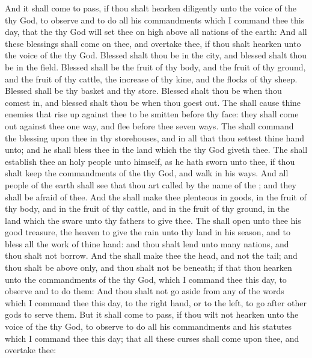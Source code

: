 \begin{biblechapter} %
 And it shall come to pass, if thou shalt hearken diligently unto the voice of the \LORD thy God, to observe and to do all his commandments which I command thee this day, that the \LORD thy God will set thee on high above all nations of the earth:
\verse And all these blessings shall come on thee, and overtake thee, if thou shalt hearken unto the voice of the \LORD thy God.
\verse Blessed shalt thou be in the city, and blessed shalt thou be in the field.
\verse Blessed shall be the fruit of thy body, and the fruit of thy ground, and the fruit of thy cattle, the increase of thy kine, and the flocks of thy sheep.
\verse Blessed shall be thy basket and thy store.
\verse Blessed shalt thou be when thou comest in, and blessed shalt thou be when thou goest out.
\verse The \LORD shall cause thine enemies that rise up against thee to be smitten before thy face: they shall come out against thee one way, and flee before thee seven ways.
\verse The \LORD shall command the blessing upon thee in thy storehouses, and in all that thou settest thine hand unto; and he shall bless thee in the land which the \LORD thy God giveth thee.
\verse The \LORD shall establish thee an holy people unto himself, as he hath sworn unto thee, if thou shalt keep the commandments of the \LORD thy God, and walk in his ways.
\verse And all people of the earth shall see that thou art called by the name of the \LORD; and they shall be afraid of thee.
\verse And the \LORD shall make thee plenteous in goods, in the fruit of thy body, and in the fruit of thy cattle, and in the fruit of thy ground, in the land which the \LORD sware unto thy fathers to give thee.
\verse The \LORD shall open unto thee his good treasure, the heaven to give the rain unto thy land in his season, and to bless all the work of thine hand: and thou shalt lend unto many nations, and thou shalt not borrow.
\verse And the \LORD shall make thee the head, and not the tail; and thou shalt be above only, and thou shalt not be beneath; if that thou hearken unto the commandments of the \LORD thy God, which I command thee this day, to observe and to do them:
\verse And thou shalt not go aside from any of the words which I command thee this day, to the right hand, or to the left, to go after other gods to serve them.
 But it shall come to pass, if thou wilt not hearken unto the voice of the \LORD thy God, to observe to do all his commandments and his statutes which I command thee this day; that all these curses shall come upon thee, and overtake thee:

\end{biblechapter}
